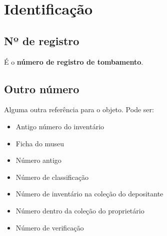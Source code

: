 
\lstset{language=XML}
\section{Identificação}
\subsection{Nº de registro}
É o \textbf{número de registro de tombamento}.

\subsection{Outro número}
Alguma outra referência para o objeto. Pode ser:
\begin{itemize}
	\item Antigo número do inventário
	\item Ficha do museu
	\item Número antigo
	\item Número de classificação
	\item Número de inventário na coleção do depositante
	\item Número dentro da coleção do proprietário
	\item Número de verificação
\end{itemize}